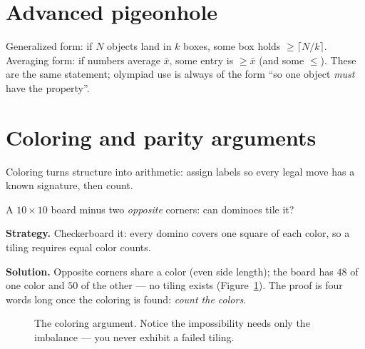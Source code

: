 \section{Advanced pigeonhole}
Generalized form: if $N$ objects land in $k$ boxes, some box holds
$\ge\lceil N/k\rceil$. Averaging form: if numbers average $\bar x$,
some entry is $\ge\bar x$ (and some $\le$). These are the same
statement; olympiad use is always of the form ``so one object
\emph{must} have the property''.

\section{Coloring and parity arguments}
Coloring turns structure into arithmetic: assign labels so every legal
move has a known signature, then count.
\begin{example}
A $10\times10$ board minus two \emph{opposite} corners: can dominoes
tile it?

\textbf{Strategy.} Checkerboard it: every domino covers one square of
each color, so a tiling requires equal color counts.

\textbf{Solution.} Opposite corners share a color (even side length);
the board has $48$ of one color and $50$ of the other --- no tiling
exists (Figure~\ref{fig:checker}). The proof is four words long once the
coloring is found: \emph{count the colors}.
\end{example}
\begin{figure}[ht]\centering

\caption{The coloring argument. Notice the impossibility needs only the
imbalance --- you never exhibit a failed tiling.}
\label{fig:checker}
\end{figure}

